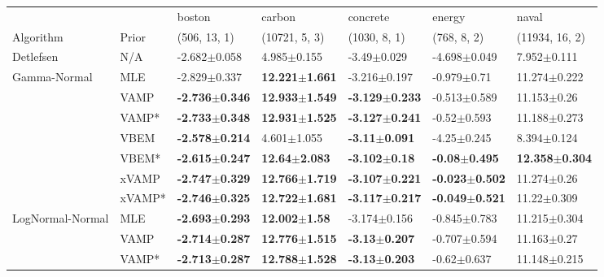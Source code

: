 \begin{tabular}{lllllll}
\toprule
                 &        &                     boston &                     carbon &                   concrete &                     energy &                      naval \\
Algorithm & Prior& (506, 13, 1)& (10721, 5, 3)& (1030, 8, 1)& (768, 8, 2)& (11934, 16, 2)\\
\midrule
Detlefsen & N/A &           -2.682$\pm$0.058 &            4.985$\pm$0.155 &            -3.49$\pm$0.029 &           -4.698$\pm$0.049 &            7.952$\pm$0.111 \\
Gamma-Normal & MLE &           -2.829$\pm$0.337 &  \textbf{12.221$\pm$1.661} &           -3.216$\pm$0.197 &            -0.979$\pm$0.71 &           11.274$\pm$0.222 \\
                 & VAMP &  \textbf{-2.736$\pm$0.346} &  \textbf{12.933$\pm$1.549} &  \textbf{-3.129$\pm$0.233} &           -0.513$\pm$0.589 &            11.153$\pm$0.26 \\
                 & VAMP* &  \textbf{-2.733$\pm$0.348} &  \textbf{12.931$\pm$1.525} &  \textbf{-3.127$\pm$0.241} &            -0.52$\pm$0.593 &           11.188$\pm$0.273 \\
                 & VBEM &  \textbf{-2.578$\pm$0.214} &            4.601$\pm$1.055 &   \textbf{-3.11$\pm$0.091} &            -4.25$\pm$0.245 &            8.394$\pm$0.124 \\
                 & VBEM* &  \textbf{-2.615$\pm$0.247} &   \textbf{12.64$\pm$2.083} &   \textbf{-3.102$\pm$0.18} &   \textbf{-0.08$\pm$0.495} &  \textbf{12.358$\pm$0.304} \\
                 & xVAMP &  \textbf{-2.747$\pm$0.329} &  \textbf{12.766$\pm$1.719} &  \textbf{-3.107$\pm$0.221} &  \textbf{-0.023$\pm$0.502} &            11.274$\pm$0.26 \\
                 & xVAMP* &  \textbf{-2.746$\pm$0.325} &  \textbf{12.722$\pm$1.681} &  \textbf{-3.117$\pm$0.217} &  \textbf{-0.049$\pm$0.521} &            11.22$\pm$0.309 \\
LogNormal-Normal & MLE &  \textbf{-2.693$\pm$0.293} &   \textbf{12.002$\pm$1.58} &           -3.174$\pm$0.156 &           -0.845$\pm$0.783 &           11.215$\pm$0.304 \\
                 & VAMP &  \textbf{-2.714$\pm$0.287} &  \textbf{12.776$\pm$1.515} &   \textbf{-3.13$\pm$0.207} &           -0.707$\pm$0.594 &            11.163$\pm$0.27 \\
                 & VAMP* &  \textbf{-2.713$\pm$0.287} &  \textbf{12.788$\pm$1.528} &   \textbf{-3.13$\pm$0.203} &            -0.62$\pm$0.637 &           11.148$\pm$0.215 \\

\end{tabular}
